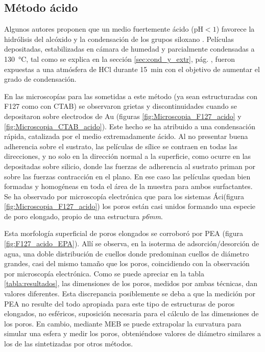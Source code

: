 
	 \subsection{Método ácido}

	 	 Algunos autores proponen que un medio fuertemente ácido (pH$<1$) favorece la hidrólisis del alcóxido y la condensación de los grupos siloxano \cite{Soler-Illia2011,Doshi2000a,Huo1996,Boissiere2000,Beck1992}. Películas depositadas, estabilizadas en cámara de humedad y parcialmente condensadas a \SI{130}{\celsius}, tal como se explica en la sección \ref{sec:cond_y_extr}, pág. \pageref{sec:cond_y_extr}, fueron expuestas a una atmósfera de HCl durante \SI{15}{\minute} con el objetivo de aumentar el grado de condensación. 

		 En las microscopías para las \pdm\space sometidas a este método (ya sean estructuradas con F127 como con CTAB) se observaron grietas y discontinuidades cuando se depositaron sobre electrodos de Au (figuras \ref{fig:Microscopia_F127_acido} y \ref{fig:Microscopia_CTAB_acido}). Este hecho se ha atribuido a una condensación rápida, catalizada por el medio extremadamente ácido. Al no presentar buena adherencia sobre el sustrato, las películas de sílice se contraen en todas las direcciones, y no solo en la dirección normal a la superficie, como ocurre en las \pdm\space depositadas sobre silicio, donde las fuerzas de adherencia al sustrato priman por sobre las fuerzas contracción en el plano\cite{Sakatani2006,Boissiere2005,Guillemin2010}. En ese caso las películas quedan bien formadas y homogéneas en toda el área de la muestra para ambos surfactantes. Se ha observado por microscopía electrónica que para los sistemas Áci\pdmF\space (figura \ref{fig:Microscopia_F127_acido}) los  poros están casi unidos formando una especie de poro elongado, propio de una estructura \textit{p6mm}\cite{GonzalezSolveyra2017}. 
	
		 Esta morfología superficial de poros elongados se corroboró por PEA (figura \ref{fig:F127_acido_EPA}). Allí se observa, en la isoterma de adsorción/desorción de agua, una doble distribución de cuellos donde predominan cuellos de diámetro grandes, casi del mismo tamaño que los poros, coincidiendo con la observación por microscopía electrónica.
		 Como se puede apreciar en la tabla \ref{tabla:resultados}, las dimensiones de los poros, medidos por ambas técnicas, dan valores diferentes. Esta discrepancia posiblemente se deba a que la medición por PEA no resulte del todo apropiada para este tipo de estructuras de poros elongados, no esféricos, suposición necesaria para el cálculo de las dimensiones de los poros. En cambio, mediante MEB se puede extrapolar la curvatura para simular una esfera y medir los poros, obteniéndose valores de diámetro similares a los de las \pdmF\space sintetizadas por otros métodos.

